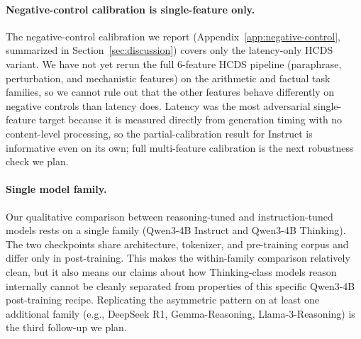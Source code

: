 \documentclass{article}
\theoremstyle{plain}
\theoremstyle{definition}
\theoremstyle{remark}
\begin{document}
\paragraph{Negative-control calibration is single-feature only.}
The negative-control calibration we report (Appendix~\ref{app:negative-control}, summarized in Section~\ref{sec:discussion}) covers only the latency-only HCDS variant. We have not yet rerun the full 6-feature HCDS pipeline (paraphrase, perturbation, and mechanistic features) on the arithmetic and factual task families, so we cannot rule out that the other features behave differently on negative controls than latency does. Latency was the most adversarial single-feature target because it is measured directly from generation timing with no content-level processing, so the partial-calibration result for Instruct is informative even on its own; full multi-feature calibration is the next robustness check we plan.

\paragraph{Single model family.}
Our qualitative comparison between reasoning-tuned and instruction-tuned models rests on a single family (Qwen3-4B Instruct and Qwen3-4B Thinking). The two checkpoints share architecture, tokenizer, and pre-training corpus and differ only in post-training. This makes the within-family comparison relatively clean, but it also means our claims about how Thinking-class models reason internally cannot be cleanly separated from properties of this specific Qwen3-4B post-training recipe. Replicating the asymmetric pattern on at least one additional family (e.g., DeepSeek R1, Gemma-Reasoning, Llama-3-Reasoning) is the third follow-up we plan.
\end{document}
